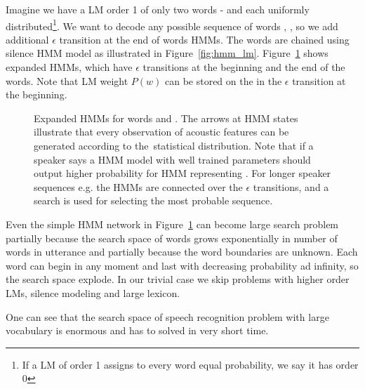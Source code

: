 {Imagine we have a \ac{LM} order 1 of only two words -  and  each uniformly distributed\footnote{If a \ac{LM} of order 1 assigns to every word equal probability, we say it has order 0}.
We want to decode any possible sequence of words , , so we add additional $\epsilon$ transition at the end of words \acp{HMM}. 
The words are chained using silence \ac{HMM} model as illustrated in Figure~\ref{fig:hmm_lm}.
Figure~\ref{fig:hmm_alt} shows expanded \acp{HMM}, which have $\epsilon$ transitions at the beginning and the end of the words. 
Note that \ac{LM} weight $P(w)$ can be stored on the in the $\epsilon$ transition at the beginning.
\begin{figure}[!htp]
    \begin{center}
        
        \caption{Expanded \acp{HMM} for words  and . 
        The arrows at \ac{HMM} states illustrate that every observation of acoustic features 
        can be generated according to the~statistical distribution. 
        Note that if a speaker says  a \ac{HMM} model with well trained parameters should output higher probability
        for \ac{HMM} representing . For longer speaker sequences e.g.  the \acp{HMM} are connected over the 
$\epsilon$ transitions, and a search is used for selecting the most probable sequence.}
        \label{fig:hmm_alt} 
    \end{center}
\end{figure}

Even the simple \ac{HMM} network in Figure~\ref{fig:hmm_alt} can become large search problem partially because the search space of words grows exponentially in number of words in utterance and partially because the word boundaries are unknown. 
Each word can begin in any moment and last with decreasing probability ad infinity, so the search space explode.
In our trivial case we skip problems with higher order \acp{LM}, silence modeling and large lexicon.

One can see that the search space of speech recognition problem with large vocabulary is enormous and has to solved in very short time.

}
